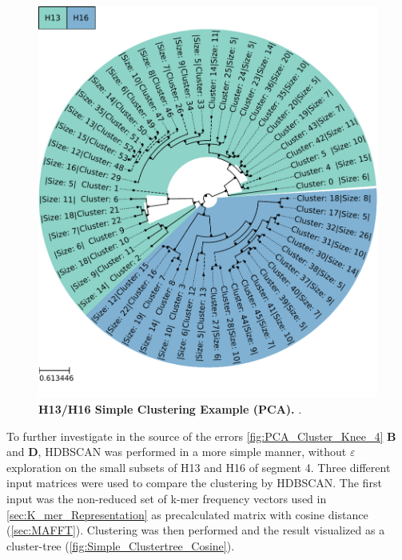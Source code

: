 \begin{figure}[!hbt]
    \centering
    \includegraphics[width=\textwidth]{PCA/Clustertree_Segment_4_H_Simple.pdf}
    \caption[H13/H16 Simple Clustering Example (\Acrshort{PCA})]{\textbf{H13/H16 Simple Clustering Example (\Acrshort{PCA}).} .}
    \label{fig:Simple_Clustertree_PCA}
\end{figure}

To further investigate in the source of the errors \autoref{fig:PCA_Cluster_Knee_4} \textbf{\textsf{B}} and \textbf{\textsf{D}}, \gls{HDBSCAN} was performed in a more simple manner, without $\varepsilon$ exploration on the small subsets of H13 and H16 of segment 4. Three different input matrices were used to compare the clustering by \gls{HDBSCAN}. The first input was the non-reduced set of k-mer frequency vectors used in \autoref{sec:K_mer_Representation} as precalculated matrix with cosine distance (\autoref{sec:MAFFT}). Clustering was then performed and the result visualized as a cluster-tree (\autoref{fig:Simple_Clustertree_Cosine}). 

